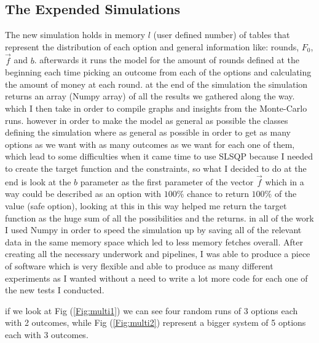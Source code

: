 \documentclass{article}
\begin{document}
	\subsection{The Expended Simulations}
	The new simulation holds in memory $l$ (user defined number) of tables that represent the distribution of each option and general information like: rounds, $F_0$, $\overrightarrow{f}$ and $b$. afterwards it runs the model for the amount of rounds defined at the beginning each time picking an outcome from each of the options and calculating the amount of money at each round. at the end of the simulation the simulation returns an array (Numpy array) of all the results we gathered along the way.
	which I then take in order to compile graphs and insights from the Monte-Carlo runs.
	however in order to make the model as general as possible the classes defining the simulation where as general as possible in order to get as many options as we want with as many outcomes as we want for each one of them, which lead to some difficulties when it came time to use SLSQP because I needed to create the target function and the constraints, so what I decided to do at the end is look at the $b$ parameter as the first parameter of the vector $\overrightarrow{f}$ which in a way could be described as an option with $100\%$ chance to return $100\%$ of the value (safe option), looking at this in this way helped me return the target function as the huge sum of all the possibilities and the returns. in all of the work I used Numpy in order to speed the simulation up by saving all of the relevant data in the same memory space which led to less memory fetches overall.\newline
	After creating all the necessary underwork and pipelines, I was able to produce a piece of software which is very flexible and able to produce as many different experiments as I wanted without a need to write a lot more code for each one of the new tests I conducted.\newline
	
	if we look at Fig (\ref{Fig:multi1}) we can see four random runs of 3 options each with 2 outcomes, while Fig (\ref{Fig:multi2}) represent a bigger system of 5 options each with 3 outcomes.
	
\end{document}
